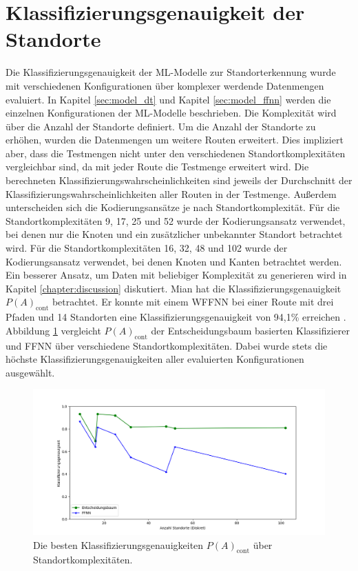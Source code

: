 \section{Klassifizierungsgenauigkeit der Standorte}
Die Klassifizierungsgenauigkeit der ML-Modelle zur Standorterkennung wurde mit verschiedenen Konfigurationen über komplexer werdende Datenmengen evaluiert.
In Kapitel \ref{sec:model_dt} und Kapitel \ref{sec:model_ffnn} werden die einzelnen Konfigurationen der ML-Modelle beschrieben.
Die Komplexität wird über die Anzahl der Standorte definiert.
Um die Anzahl der Standorte zu erhöhen, wurden die Datenmengen um weitere Routen erweitert.
Dies impliziert aber, dass die Testmengen nicht unter den verschiedenen Standortkomplexitäten vergleichbar sind, da mit jeder Route die Testmenge erweitert wird.
Die berechneten Klassifizierungswahrscheinlichkeiten sind jeweils der Durchschnitt der Klassifizierungswahrscheinlichkeiten aller Routen in der Testmenge.
\newline
\newline
Außerdem unterscheiden sich die Kodierungsansätze je nach Standortkomplexität.
Für die Standortkomplexitäten 9, 17, 25 und 52 wurde der Kodierungsansatz verwendet, bei denen nur die Knoten und ein zusätzlicher unbekannter Standort betrachtet wird.
Für die Standortkomplexitäten 16, 32, 48 und 102 wurde der Kodierungsansatz verwendet, bei denen Knoten und Kanten betrachtet werden.
Ein besserer Ansatz, um Daten mit beliebiger Komplexität zu generieren wird in Kapitel \ref{chapter:discussion} diskutiert.
\newline
\newline
Mian hat die Klassifizierungsgenauigkeit $P(A)_{\text{cont}}$ betrachtet.
Er konnte mit einem WFFNN bei einer Route mit drei Pfaden und 14 Standorten eine Klassifizierungsgenauigkeit von 94,1\% erreichen \cite{naveedThesis}.
Abbildung \ref{fig:best_dt_acc_vs_knn_using_cont} vergleicht $P(A)_{\text{cont}}$ der Entscheidungsbaum basierten Klassifizierer und FFNN über verschiedene Standortkomplexitäten.
Dabei wurde stets die höchste Klassifizierungsgenauigkeiten aller evaluierten Konfigurationen ausgewählt.
\begin{figure}[h!]
    \centering
    \includegraphics[width=\linewidth]{images/best_dt_vs_best_ffnn_over_num_loc_using_acc_cont.png}
    \caption{Die besten Klassifizierungsgenauigkeiten $P(A)_{\text{cont}}$ über Standortkomplexitäten.}
    \label{fig:best_dt_acc_vs_knn_using_cont}
\end{figure}
